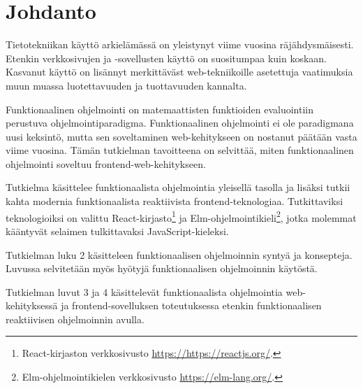 \chapter{Johdanto} \label{Johdanto}
Tietotekniikan käyttö arkielämässä on yleistynyt viime vuosina räjähdysmäisesti. Etenkin verkkosivujen ja -sovellusten
käyttö on suositumpaa kuin koskaan. Kasvanut käyttö on lisännyt merkittäväst web-tekniikoille asetettuja vaatimuksia
muun muassa luotettavuuden ja tuottavuuden kannalta. 

Funktionaalinen ohjelmointi on matemaattisten funktioiden evaluointiin perustuva ohjelmointiparadigma. Funktionaalinen
ohjelmointi ei ole paradigmana uusi keksintö, mutta sen soveltaminen web-kehitykseen on nostanut päätään vasta viime
vuosina. Tämän tutkielman tavoitteena on selvittää, miten funktionaalinen ohjelmointi soveltuu frontend-web-kehitykseen.

Tutkielma käsittelee funktionaalista ohjelmointia yleisellä tasolla ja lisäksi tutkii kahta modernia funktionaalista
reaktiivista frontend-teknologiaa. Tutkittaviksi teknologioiksi on valittu
React-kirjasto\footnote{React-kirjaston verkkosivusto \url{https://https://reactjs.org/}.} ja
Elm-ohjelmointikieli\footnote{Elm-ohjelmointikielen verkkosivusto \url{https://elm-lang.org/}.}, jotka molemmat
kääntyvät selaimen tulkittavaksi JavaScript-kieleksi.

Tutkielman luku 2 käsitteleen funktionaalisen ohjelmoinnin syntyä ja konsepteja. Luvussa selvitetään myös hyötyjä
funktionaalisen ohjelmoinnin käytöstä.

Tutkielman luvut 3 ja 4 käsittelevät funktionaalista ohjelmointia web-kehitykses\-sä ja frontend-sovelluksen toteutuksessa
etenkin funktionaalisen reaktiivisen ohjelmoinnin avulla.
